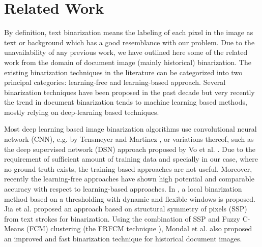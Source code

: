 \documentclass[runningheads]{llncs}
\begin{document}
	\section{Related Work}
\label{related_work}
By definition, text binarization means the labeling of each pixel in the image as text or background which has a good resemblance with our problem. Due to the unavailability of any previous work, we have outlined here some of the related work from the domain of document image (mainly historical) binarization. The existing binarization techniques in the literature can be categorized into two principal categories: learning-free and learning-based approach. Several binarization techniques have been proposed in the past decade but very recently the trend in document binarization tends to machine learning based methods, mostly relying on deep-learning based techniques. 

Most deep learning based image binarization algorithms use convolutional neural network (CNN), e.g. by Tensmeyer and Martinez \cite{Tensmeyer2018}, or variations thereof, such as the deep supervised network (DSN) approach proposed by Vo et al. \cite{Vo2017}.  
Due to the requirement of sufficient amount of training data and specially in our case, where no ground truth exists, the training based approaches are not useful. Moreover, recently the learning-free approaches \cite{Jia2016} have shown high potential and comparable accuracy with respect to learning-based approaches. In \cite{Bataineh2011}, a local binarization method based on a thresholding with dynamic and flexible windows is proposed. Jia et al. \cite{Jia2016} proposed an approach based on structural symmetry of pixels (SSP) from text strokes for binarization. Using the combination of SSP and Fuzzy C-Means (FCM) clustering (the FRFCM technique \cite{Lei2017}), Mondal et al. \cite{Mondal2019} also proposed an improved and fast binarization technique for historical document images. 
\end{document}
